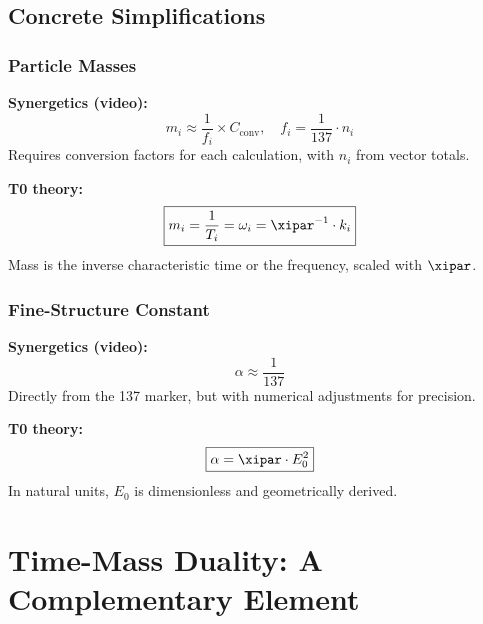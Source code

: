 	\subsection{Concrete Simplifications}
	
	\subsubsection{Particle Masses}
	
	\textbf{Synergetics (video):}
	\begin{equation}
		m_i \approx \frac{1}{f_i} \times C_{\text{conv}}, \quad f_i = \frac{1}{137} \cdot n_i
	\end{equation}
	Requires conversion factors for each calculation, with $n_i$ from vector totals.
	
	\textbf{T0 theory:}
	\begin{equation}
		\boxed{m_i = \frac{1}{T_i} = \omega_i = \xipar^{-1} \cdot k_i}
	\end{equation}
	Mass is the inverse characteristic time or the frequency, scaled with $\xipar$.
	
	\subsubsection{Fine-Structure Constant}
	
	\textbf{Synergetics (video):}
	\begin{equation}
		\alpha \approx \frac{1}{137}
	\end{equation}
	Directly from the 137 marker, but with numerical adjustments for precision.
	
	\textbf{T0 theory:}
	\begin{equation}
		\boxed{\alpha = \xipar \cdot E_0^2}
	\end{equation}
	In natural units, $E_0$ is dimensionless and geometrically derived.
	
	\section{Time-Mass Duality: A Complementary Element}
	
